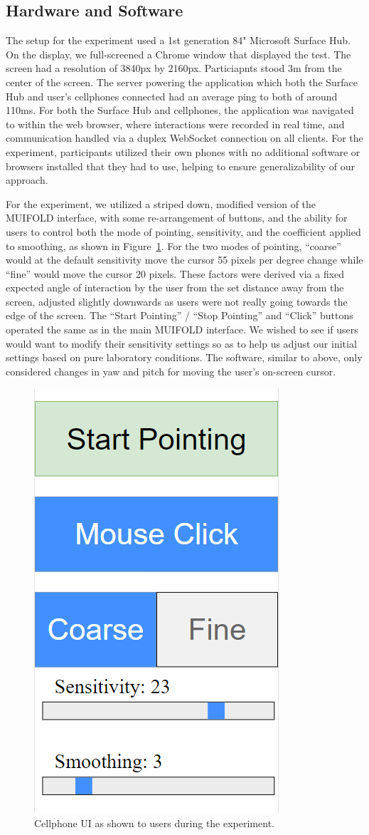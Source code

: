 \subsection{Hardware and Software}

The setup for the experiment used a 1st generation 84" Microsoft Surface Hub. On
the display, we full-screened a Chrome window that displayed the test. The screen
had a resolution of 3840px by 2160px. Particiapnts stood 3m from the center
of the screen. The server powering the application which
both the Surface Hub and user's cellphones connected had an average ping to both
of around 110ms. For both the Surface Hub and cellphones, the application was
navigated to within the web browser, where interactions were recorded in
real time, and communication handled via a duplex WebSocket connection on all
clients. For the experiment, participants utilized their own phones with no
additional software or browsers installed that they had to use, helping to ensure
generalizability of our approach.

For the experiment, we utilized a striped down, modified version of the MUIFOLD
interface, with some re-arrangement of buttons, and the ability for users to 
control both the mode of pointing, sensitivity, and the coefficient applied to 
smoothing, as shown in Figure~\ref{fig:experiment_ui}.
For the two modes of pointing, ``coarse'' would at the default 
sensitivity move the cursor 55 pixels per degree change while ``fine'' would
move the cursor 20 pixels. These factors were derived via a fixed expected
angle of interaction by the user from the set distance away from the screen,
adjusted slightly downwards as users were not really going towards the edge
of the screen. The ``Start Pointing'' / ``Stop Pointing'' and 
``Click'' buttons operated the same as in the main MUIFOLD interface. We wished
to see if users would want to modify their sensitivity settings so as to help
us adjust our initial settings based on pure laboratory conditions. The software,
similar to above, only considered changes in yaw and pitch for moving the
user's on-screen cursor.

\begin{figure}
\centering
  \includegraphics[width=0.4\columnwidth]{chapters/04_muifold/figures/experiment_ui.png}
  \caption{Cellphone UI as shown to users during the experiment.}
  \label{fig:experiment_ui}
\end{figure}